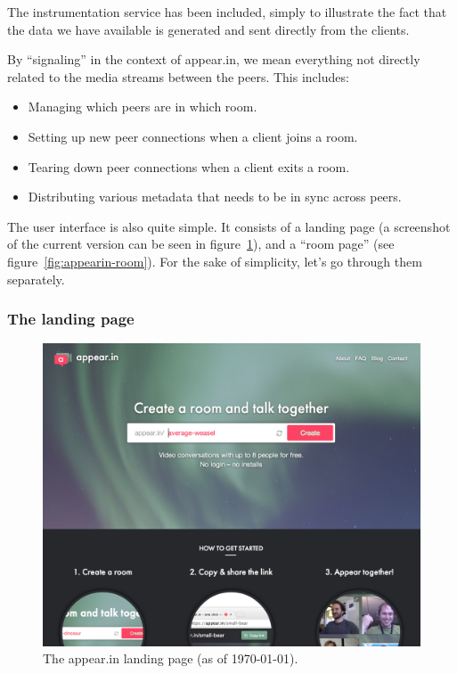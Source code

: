 The instrumentation service has been included, simply to illustrate the fact that the data we have available is generated and sent directly from the clients.

By ``signaling'' in the context of appear.in, we mean everything not directly related to the media streams between the peers. This includes:

\begin{itemize}
  \item Managing which peers are in which room.
  \item Setting up new peer connections when a client joins a room.
  \item Tearing down peer connections when a client exits a room.
  \item Distributing various metadata that needs to be in sync across peers.
\end{itemize}

The user interface is also quite simple. It consists of a landing page (a screenshot of the current version can be seen in figure~\ref{fig:appearin-landing}), and a ``room page'' (see figure~\ref{fig:appearin-room}). For the sake of simplicity, let's go through them separately.

\subsubsection{The landing page}

\begin{figure}[h]
  \centering
    \includegraphics[width=\textwidth]{Figures/screenshots/appearin/frontpage-v2}
    \caption{The appear.in landing page (as of \today).}
    \label{fig:appearin-landing}
\end{figure}

